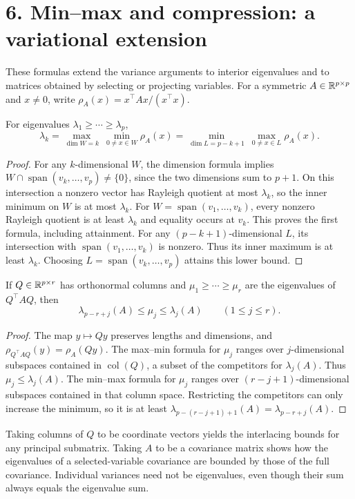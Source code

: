 \section*{6. Min--max and compression: a variational extension}
These formulas extend the variance arguments to interior eigenvalues
and to matrices obtained by selecting or projecting variables.
For a symmetric $A\in\mathbb R^{p\times p}$ and $x\ne0$, write
$\rho_A(x)=x^\top Ax/(x^\top x)$.

\begin{theorem}\label{thm:12:minmax}
For eigenvalues $\lambda_1\geqslant\cdots\geqslant\lambda_p$,
\[
\lambda_k=
\max_{\dim W=k}\ \min_{0\ne x\in W}\rho_A(x)
=\min_{\dim L=p-k+1}\ \max_{0\ne x\in L}\rho_A(x).
\]
\end{theorem}
\begin{proof}
For any $k$-dimensional $W$, the dimension formula implies
$W\cap\operatorname{span}(v_k,\ldots,v_p)\ne\{0\}$, since the two
dimensions sum to $p+1$. On this intersection a nonzero vector has
Rayleigh quotient at most $\lambda_k$, so the inner minimum on $W$
is at most $\lambda_k$. For
$W=\operatorname{span}(v_1,\ldots,v_k)$, every nonzero Rayleigh quotient
is at least $\lambda_k$ and equality occurs at $v_k$.
This proves the first formula, including attainment.
For any $(p-k+1)$-dimensional $L$, its intersection with
$\operatorname{span}(v_1,\ldots,v_k)$ is nonzero. Thus its inner maximum
is at least $\lambda_k$. Choosing
$L=\operatorname{span}(v_k,\ldots,v_p)$ attains this lower bound.
\end{proof}

\begin{theorem}\label{thm:12:separation}
If $Q\in\mathbb R^{p\times r}$ has orthonormal columns and
$\mu_1\geqslant\cdots\geqslant\mu_r$ are the eigenvalues of $Q^\top AQ$,
then
\[
\lambda_{p-r+j}(A)\leqslant\mu_j\leqslant\lambda_j(A)
\qquad(1\leqslant j\leqslant r).
\]
\end{theorem}
\begin{proof}
The map $y\mapsto Qy$ preserves lengths and dimensions, and
$\rho_{Q^\top AQ}(y)=\rho_A(Qy)$.
The max--min formula for $\mu_j$ ranges over $j$-dimensional subspaces
contained in $\operatorname{col}(Q)$, a subset of the competitors for
$\lambda_j(A)$. Thus $\mu_j\leqslant\lambda_j(A)$.
The min--max formula for $\mu_j$ ranges over $(r-j+1)$-dimensional
subspaces contained in that column space. Restricting the competitors
can only increase the minimum, so it is at least
$\lambda_{p-(r-j+1)+1}(A)=\lambda_{p-r+j}(A)$.
\end{proof}

Taking columns of $Q$ to be coordinate vectors yields the interlacing
bounds for any principal submatrix. Taking $A$ to be a covariance matrix
shows how the eigenvalues of a selected-variable covariance are bounded
by those of the full covariance. Individual variances need not be
eigenvalues, even though their sum always equals the eigenvalue sum.
